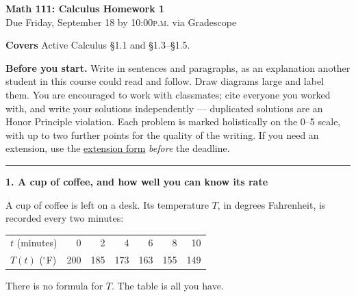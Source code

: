 \documentclass[11pt]{article}
\newcommand{\prob}[1]{\medskip\noindent\textbf{\large #1}\par\smallskip}
\begin{document}
\begin{center}
{\Large\bfseries Math 111: Calculus \quad Homework 1}\\[4pt]
{Due Friday, September 18 by 10:00\textsc{p.m.} via Gradescope}
\end{center}

\medskip
\noindent\textbf{Covers} Active Calculus \S1.1 and \S1.3--\S1.5.

\smallskip
\noindent\textbf{Before you start.} Write in sentences and paragraphs, as an
explanation another student in this course could read and follow. Draw diagrams large
and label them. You are encouraged to work with classmates; cite everyone you worked
with, and write your solutions independently --- duplicated solutions are an Honor
Principle violation. Each problem is marked holistically on the 0--5 scale, with up
to two further points for the quality of the writing. If you need an extension, use
the \href{https://docs.google.com/forms/d/e/1FAIpQLSfIfgx44SFtUzefTNr-80yz35MVJaUqQttt96xVTU5mCQCOgg/viewform}{extension
form} \emph{before} the deadline.

\bigskip\hrule\bigskip

\prob{1. A cup of coffee, and how well you can know its rate}

A cup of coffee is left on a desk. Its temperature $T$, in degrees Fahrenheit, is
recorded every two minutes:

\smallskip
\begin{center}
\begin{tabular}{@{}lrrrrrr@{}}
\toprule
$t$ (minutes) & 0 & 2 & 4 & 6 & 8 & 10\\
$T(t)$ ($^\circ$F) & 200 & 185 & 173 & 163 & 155 & 149\\
\bottomrule
\end{tabular}
\end{center}
\smallskip

There is no formula for $T$. The table is all you have.
\end{document}

